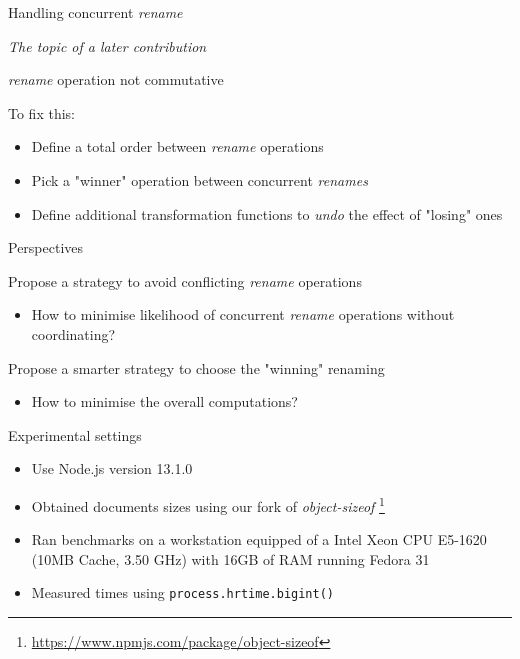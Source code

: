 \documentclass[10pt]{beamer}
\begin{document}
\begin{frame}{Handling concurrent \emph{rename}}
  \begin{center}
    \emph{The topic of a later contribution}
  \end{center}

  \pause

  \begin{block}{\alert{\emph{rename} operation not commutative}}
  \end{block}

  \pause

  \begin{block}{To fix this:}
    \begin{itemize}
      \item Define a total order between \emph{rename} operations
      \item Pick a "winner" operation between concurrent \emph{renames}
      \item Define additional transformation functions to \emph{undo} the effect of "losing" ones
    \end{itemize}
  \end{block}
\end{frame}

\begin{frame}{Perspectives}
  \begin{block}{Propose a strategy to avoid conflicting \emph{rename} operations}
    \begin{itemize}
      \item How to minimise likelihood of concurrent \emph{rename} operations without coordinating?
    \end{itemize}
  \end{block}

  \pause

  \begin{block}{Propose a smarter strategy to choose the "winning" renaming}
    \begin{itemize}
      \item How to minimise the overall computations?
    \end{itemize}
  \end{block}
\end{frame}

\begin{frame}{Experimental settings}
  \begin{itemize}
    \item Use Node.js version 13.1.0
    \item Obtained documents sizes using our fork of \emph{object-sizeof} \footnote{\url{https://www.npmjs.com/package/object-sizeof}}
    \item Ran benchmarks on a workstation equipped of a Intel Xeon CPU E5-1620 (10MB Cache, 3.50 GHz) with 16GB of RAM running Fedora 31
    \item Measured times using \texttt{process.hrtime.bigint()}
  \end{itemize}
\end{frame}
\end{document}
